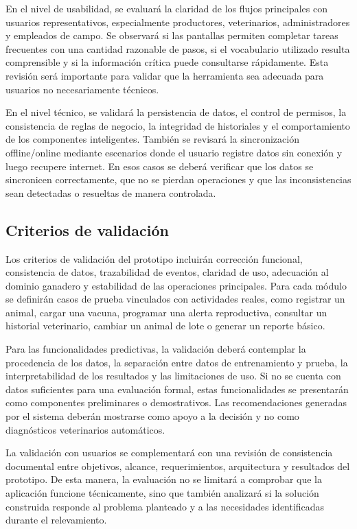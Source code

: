 En el nivel de usabilidad, se evaluar\'a la claridad de los flujos principales con usuarios representativos, especialmente productores, veterinarios, administradores y empleados de campo. Se observar\'a si las pantallas permiten completar tareas frecuentes con una cantidad razonable de pasos, si el vocabulario utilizado resulta comprensible y si la informaci\'on cr\'itica puede consultarse r\'apidamente. Esta revisi\'on ser\'a importante para validar que la herramienta sea adecuada para usuarios no necesariamente t\'ecnicos.

En el nivel t\'ecnico, se validar\'a la persistencia de datos, el control de permisos, la consistencia de reglas de negocio, la integridad de historiales y el comportamiento de los componentes inteligentes. Tambi\'en se revisar\'a la sincronizaci\'on offline/online mediante escenarios donde el usuario registre datos sin conexi\'on y luego recupere internet. En esos casos se deber\'a verificar que los datos se sincronicen correctamente, que no se pierdan operaciones y que las inconsistencias sean detectadas o resueltas de manera controlada.

\subsection{Criterios de validaci\'on}

Los criterios de validaci\'on del prototipo incluir\'an correcci\'on funcional, consistencia de datos, trazabilidad de eventos, claridad de uso, adecuaci\'on al dominio ganadero y estabilidad de las operaciones principales. Para cada m\'odulo se definir\'an casos de prueba vinculados con actividades reales, como registrar un animal, cargar una vacuna, programar una alerta reproductiva, consultar un historial veterinario, cambiar un animal de lote o generar un reporte b\'asico.

Para las funcionalidades predictivas, la validaci\'on deber\'a contemplar la procedencia de los datos, la separaci\'on entre datos de entrenamiento y prueba, la interpretabilidad de los resultados y las limitaciones de uso. Si no se cuenta con datos suficientes para una evaluaci\'on formal, estas funcionalidades se presentar\'an como componentes preliminares o demostrativos. Las recomendaciones generadas por el sistema deber\'an mostrarse como apoyo a la decisi\'on y no como diagn\'osticos veterinarios autom\'aticos.

La validaci\'on con usuarios se complementar\'a con una revisi\'on de consistencia documental entre objetivos, alcance, requerimientos, arquitectura y resultados del prototipo. De esta manera, la evaluaci\'on no se limitar\'a a comprobar que la aplicaci\'on funcione t\'ecnicamente, sino que tambi\'en analizar\'a si la soluci\'on construida responde al problema planteado y a las necesidades identificadas durante el relevamiento.

